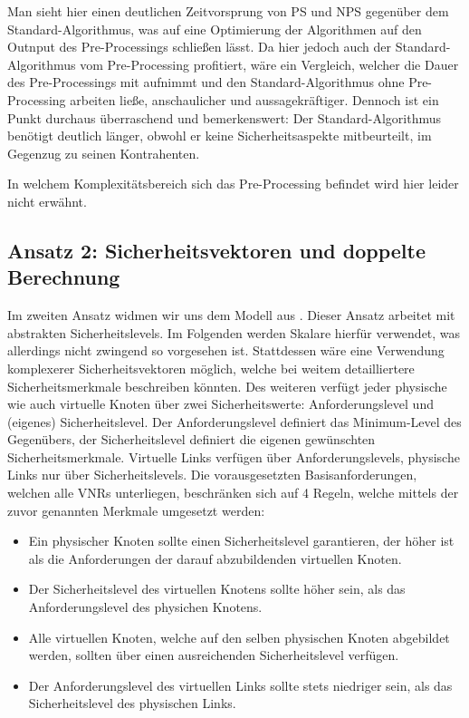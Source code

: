 \documentclass{lni}
\begin{document}
Man sieht  hier einen deutlichen Zeitvorsprung von PS und NPS gegenüber dem Standard-Algorithmus, was auf eine Optimierung der Algorithmen auf den Outnput des Pre-Processings schließen lässt. Da hier jedoch auch der Standard-Algorithmus vom Pre-Processing profitiert, wäre ein Vergleich, welcher die Dauer des Pre-Processings mit aufnimmt und den Standard-Algorithmus ohne Pre-Processing arbeiten ließe, anschaulicher und aussagekräftiger.
Dennoch ist ein Punkt durchaus überraschend und bemerkenswert: Der Standard-Algorithmus benötigt deutlich länger, obwohl er keine Sicherheitsaspekte mitbeurteilt, im Gegenzug zu seinen Kontrahenten.

In welchem Komplexitätsbereich sich das Pre-Processing befindet wird hier leider nicht erwähnt.


\subsection{Ansatz 2: Sicherheitsvektoren und doppelte Berechnung}
\label{subsec:ansatz2}

Im zweiten Ansatz widmen wir uns dem Modell aus \cite{algo2}. Dieser Ansatz arbeitet mit abstrakten Sicherheitslevels. Im Folgenden werden Skalare hierfür verwendet, was allerdings nicht zwingend so vorgesehen ist. Stattdessen wäre eine Verwendung komplexerer Sicherheitsvektoren möglich, welche bei weitem detailliertere Sicherheitsmerkmale  beschreiben könnten. Des weiteren verfügt jeder physische wie auch virtuelle Knoten über zwei Sicherheitswerte: Anforderungslevel und (eigenes) Sicherheitslevel. Der Anforderungslevel definiert das Minimum-Level des Gegenübers, der Sicherheitslevel definiert die eigenen gewünschten Sicherheitsmerkmale. Virtuelle Links verfügen über Anforderungslevels, physische Links nur über Sicherheitslevels. Die vorausgesetzten Basisanforderungen, welchen alle VNRs unterliegen, beschränken sich auf 4 Regeln, welche mittels der zuvor genannten Merkmale umgesetzt werden:
\begin{itemize}
\item Ein physischer Knoten sollte einen Sicherheitslevel garantieren, 
   der höher ist als die Anforderungen der darauf abzubildenden
   virtuellen Knoten.

\item Der Sicherheitslevel des virtuellen Knotens sollte höher sein, 
   als das Anforderungslevel des physichen Knotens.

\item Alle virtuellen Knoten, welche auf den selben physischen Knoten
   abgebildet werden, sollten über einen ausreichenden Sicherheitslevel
   verfügen. 

\item Der Anforderungslevel des virtuellen Links sollte stets niedriger
   sein, als das Sicherheitslevel des physischen Links.
\end{itemize}
\end{document}
